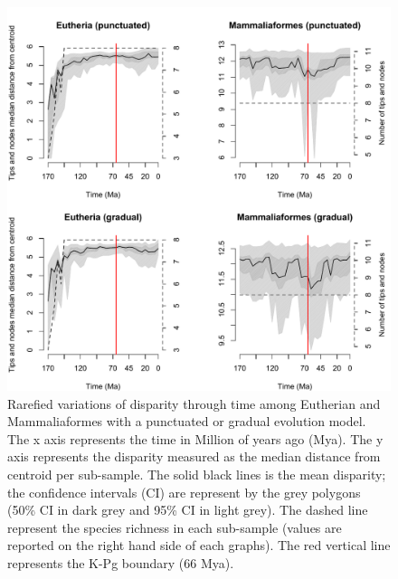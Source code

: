 \documentclass[12pt,letterpaper]{article}
\begin{document}
\begin{figure}[!htbp]
\centering
    \includegraphics[keepaspectratio=true]{Figures/Main_results_rarefied.pdf}
\caption{Rarefied variations of disparity through time among Eutherian and Mammaliaformes with a punctuated or gradual evolution model. The x axis represents the time in Million of years ago (Mya). The y axis represents the disparity measured as the median distance from centroid per sub-sample. The solid black lines is the mean disparity; the confidence intervals (CI) are represent by the grey polygons (50\% CI in dark grey and 95\% CI in light grey). The dashed line represent the species richness in each sub-sample (values are reported on the right hand side of each graphs). The red vertical line represents the K-Pg boundary (66 Mya).}
\label{fig:Fig_Rar_results}
\end{figure}
\end{document}
